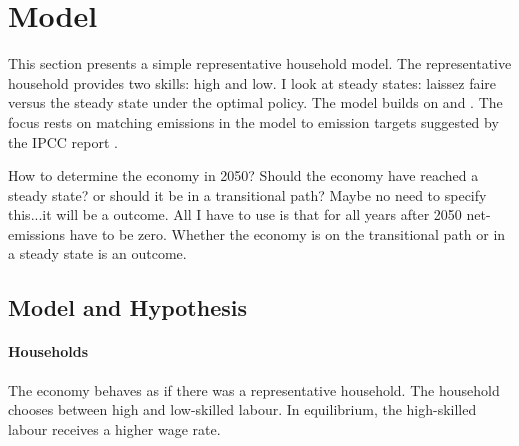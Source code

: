 \section{Model}
This section presents a simple representative household model. The representative household provides two skills: high and low. I look at steady states: laissez faire versus the steady state under the optimal policy. 
The model builds on \cite{Acemoglu2012TheChange} and \cite{Heathcote2017OptimalFramework}. 
The focus rests on matching emissions in the model to emission targets suggested by the IPCC report \citep{Rogelj2018MitigationDevelopment.}. 

How to determine the economy in 2050? Should the economy have reached a steady state? or should it be in a transitional path? Maybe no need to specify this...it will be a outcome. All I have to use is that for all years after 2050 net-emissions have to be zero. Whether the economy is on the transitional path or in a steady state is an outcome. 
\subsection{Model and Hypothesis}

\paragraph{Households}
The economy behaves as if there was a representative household. The household chooses between high and low-skilled labour.  In equilibrium, the high-skilled labour receives a higher wage rate. 


